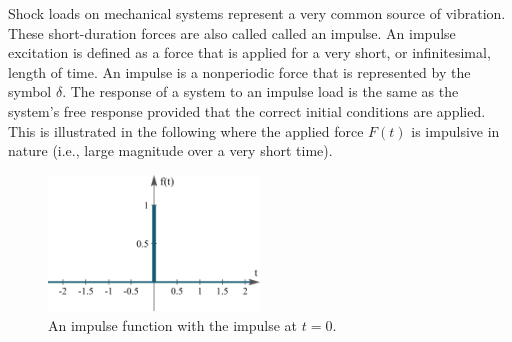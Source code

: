 \documentclass[12pt,letter]{article}
\numberwithin{ex}{section} %
\numberwithin{re}{section} %
\begin{document}
Shock loads on mechanical systems represent a very common source of vibration. These short-duration forces are also called called an impulse. An impulse excitation is defined as a force that is applied for a very short, or infinitesimal, length of time. An impulse is a nonperiodic force that is represented by the symbol $\delta$. The response of a system to an impulse load is the same as the system's free response provided that the correct initial conditions are applied. This is illustrated in the following where the applied force $F(t)$ is impulsive in nature (i.e., large magnitude over a very short time).

\begin{figure}[H]
	\centering
	\includegraphics[width=0.5\textwidth]{../Figures/unit_impulse.png}
	\caption{An impulse function with the impulse at $t=0$. }
\end{figure}
\end{document}
